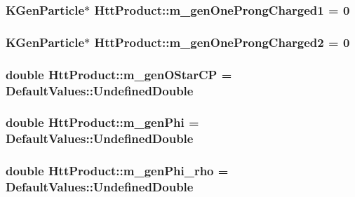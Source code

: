 \label{classHttProduct_adbf6b4ae920c78e982d14c577d720ad5}
\hypertarget{classHttProduct_a53a29768acceece5863f783c114d7e2f}{
\subsubsection[{m\_\-genOneProngCharged1}]{\setlength{\rightskip}{0pt plus 5cm}KGenParticle$\ast$ {\bf HttProduct::m\_\-genOneProngCharged1} = 0}}
\label{classHttProduct_a53a29768acceece5863f783c114d7e2f}
\hypertarget{classHttProduct_a3cad468b45916675c7d3b551d3deb421}{
\subsubsection[{m\_\-genOneProngCharged2}]{\setlength{\rightskip}{0pt plus 5cm}KGenParticle$\ast$ {\bf HttProduct::m\_\-genOneProngCharged2} = 0}}
\label{classHttProduct_a3cad468b45916675c7d3b551d3deb421}
\hypertarget{classHttProduct_ab159ac6f1da38310b236baacbf299ea2}{
\subsubsection[{m\_\-genOStarCP}]{\setlength{\rightskip}{0pt plus 5cm}double {\bf HttProduct::m\_\-genOStarCP} = DefaultValues::UndefinedDouble}}
\label{classHttProduct_ab159ac6f1da38310b236baacbf299ea2}
\hypertarget{classHttProduct_a0a2c6b3a36ff1a5f90830f63212336da}{
\subsubsection[{m\_\-genPhi}]{\setlength{\rightskip}{0pt plus 5cm}double {\bf HttProduct::m\_\-genPhi} = DefaultValues::UndefinedDouble}}
\label{classHttProduct_a0a2c6b3a36ff1a5f90830f63212336da}
\hypertarget{classHttProduct_a2fe4a315ccbd2834d619db751d842cb8}{
\subsubsection[{m\_\-genPhi\_\-rho}]{\setlength{\rightskip}{0pt plus 5cm}double {\bf HttProduct::m\_\-genPhi\_\-rho} = DefaultValues::UndefinedDouble}}
